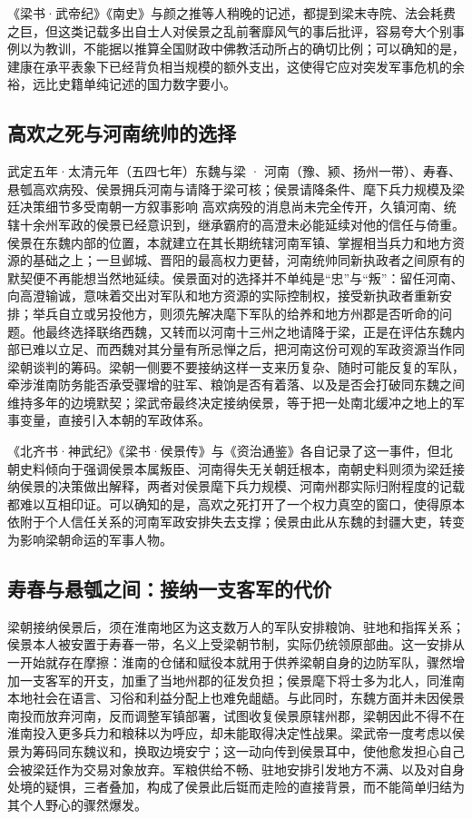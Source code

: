 《梁书·武帝纪》《南史》与颜之推等人稍晚的记述，都提到梁末寺院、法会耗费之巨，但这类记载多出自士人对侯景之乱前奢靡风气的事后批评，容易夸大个别事例以为教训，不能据以推算全国财政中佛教活动所占的确切比例；可以确知的是，建康在承平表象下已经背负相当规模的额外支出，这使得它应对突发军事危机的余裕，远比史籍单纯记述的国力数字要小。

\subsection{高欢之死与河南统帅的选择}

\begin{event}{}{武定五年·太清元年（五四七年）}{东魏与梁 · 河南（豫、颍、扬州一带）、寿春、悬瓠}{高欢病殁、侯景拥兵河南与请降于梁可核；侯景请降条件、麾下兵力规模及梁廷决策细节多受南朝一方叙事影响}
高欢病殁的消息尚未完全传开，久镇河南、统辖十余州军政的侯景已经意识到，继承霸府的高澄未必能延续对他的信任与倚重。侯景在东魏内部的位置，本就建立在其长期统辖河南军镇、掌握相当兵力和地方资源的基础之上；一旦邺城、晋阳的最高权力更替，河南统帅同新执政者之间原有的默契便不再能想当然地延续。侯景面对的选择并不单纯是“忠”与“叛”：留任河南、向高澄输诚，意味着交出对军队和地方资源的实际控制权，接受新执政者重新安排；举兵自立或另投他方，则须先解决麾下军队的给养和地方州郡是否听命的问题。他最终选择联络西魏，又转而以河南十三州之地请降于梁，正是在评估东魏内部已难以立足、而西魏对其分量有所忌惮之后，把河南这份可观的军政资源当作同梁朝谈判的筹码。梁朝一侧要不要接纳这样一支来历复杂、随时可能反复的军队，牵涉淮南防务能否承受骤增的驻军、粮饷是否有着落、以及是否会打破同东魏之间维持多年的边境默契；梁武帝最终决定接纳侯景，等于把一处南北缓冲之地上的军事变量，直接引入本朝的军政体系。

《北齐书·神武纪》《梁书·侯景传》与《资治通鉴》各自记录了这一事件，但北朝史料倾向于强调侯景本属叛臣、河南得失无关朝廷根本，南朝史料则须为梁廷接纳侯景的决策做出解释，两者对侯景麾下兵力规模、河南州郡实际归附程度的记载都难以互相印证。可以确知的是，高欢之死打开了一个权力真空的窗口，使得原本依附于个人信任关系的河南军政安排失去支撑；侯景由此从东魏的封疆大吏，转变为影响梁朝命运的军事人物。
\end{event}

\subsection{寿春与悬瓠之间：接纳一支客军的代价}

梁朝接纳侯景后，须在淮南地区为这支数万人的军队安排粮饷、驻地和指挥关系；侯景本人被安置于寿春一带，名义上受梁朝节制，实际仍统领原部曲。这一安排从一开始就存在摩擦：淮南的仓储和赋役本就用于供养梁朝自身的边防军队，骤然增加一支客军的开支，加重了当地州郡的征发负担；侯景麾下将士多为北人，同淮南本地社会在语言、习俗和利益分配上也难免龃龉。与此同时，东魏方面并未因侯景南投而放弃河南，反而调整军镇部署，试图收复侯景原辖州郡，梁朝因此不得不在淮南投入更多兵力和粮秣以为呼应，却未能取得决定性战果。梁武帝一度考虑以侯景为筹码同东魏议和，换取边境安宁；这一动向传到侯景耳中，使他愈发担心自己会被梁廷作为交易对象放弃。军粮供给不畅、驻地安排引发地方不满、以及对自身处境的疑惧，三者叠加，构成了侯景此后铤而走险的直接背景，而不能简单归结为其个人野心的骤然爆发。

